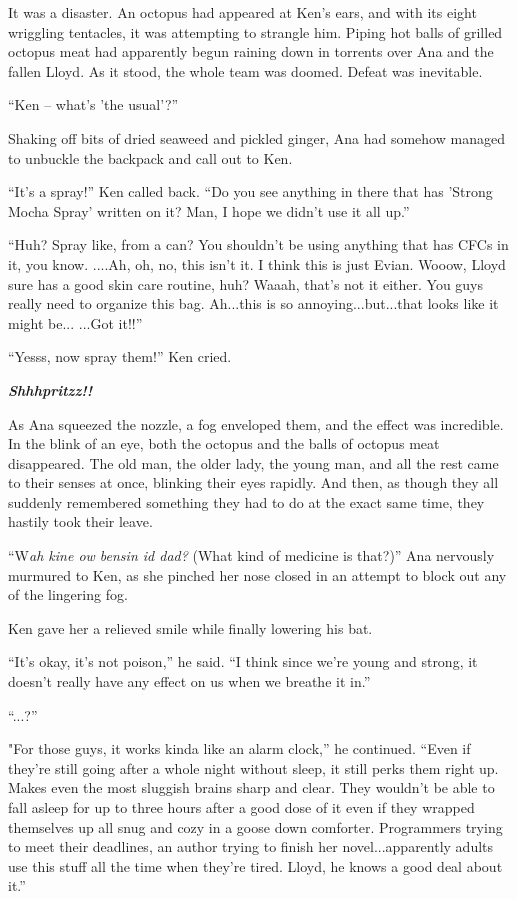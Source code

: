 \documentclass[
]{article}
\begin{document}
It was a disaster. An octopus had appeared at Ken's ears, and with its
eight wriggling tentacles, it was attempting to strangle him. Piping hot
balls of grilled octopus meat had apparently begun raining down in
torrents over Ana and the fallen Lloyd. As it stood, the whole team was
doomed. Defeat was inevitable.

``Ken -- what's 'the usual'?''

Shaking off bits of dried seaweed and pickled ginger, Ana had somehow
managed to unbuckle the backpack and call out to Ken.

``It's a spray!'' Ken called back. ``Do you see anything in there that
has 'Strong Mocha Spray' written on it? Man, I hope we didn't use it all
up.''

``Huh? Spray like, from a can? You shouldn't be using anything that has
CFCs in it, you know. ....Ah, oh, no, this isn't it. I think this is
just Evian. Wooow, Lloyd sure has a good skin care routine, huh? Waaah,
that's not it either. You guys really need to organize this bag.
Ah...this is so annoying...but...that looks like it might be... ...Got
it!!''

``Yesss, now spray them!'' Ken cried.

\emph{\textbf{Shhhpritzz!!}}

As Ana squeezed the nozzle, a fog enveloped them, and the effect was
incredible. In the blink of an eye, both the octopus and the balls of
octopus meat disappeared. The old man, the older lady, the young man,
and all the rest came to their senses at once, blinking their eyes
rapidly. And then, as though they all suddenly remembered something they
had to do at the exact same time, they hastily took their leave.

``W\emph{ah kine ow bensin id dad? }(What kind of medicine is that?)''
Ana nervously murmured to Ken, as she pinched her nose closed in an
attempt to block out any of the lingering fog.

Ken gave her a relieved smile while finally lowering his bat.

``It's okay, it's not poison,'' he said. ``I think since we're young and
strong, it doesn't really have any effect on us when we breathe it in.''

``...?''

"For those guys, it works kinda like an alarm clock,'' he continued.
``Even if they're still going after a whole night without sleep, it
still perks them right up. Makes even the most sluggish brains sharp and
clear. They wouldn't be able to fall asleep for up to three hours after
a good dose of it even if they wrapped themselves up all snug and cozy
in a goose down comforter. Programmers trying to meet their deadlines,
an author trying to finish her novel...apparently adults use this stuff
all the time when they're tired. Lloyd, he knows a good deal about it.''
\end{document}
